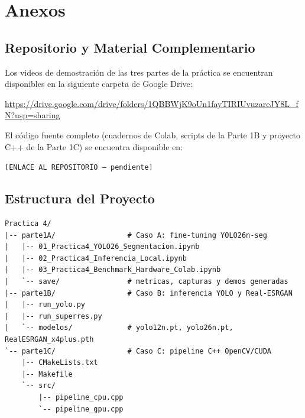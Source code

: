 \appendix
\section{Anexos}

\subsection{Repositorio y Material Complementario}

Los videos de demostración de las tres partes de la práctica se encuentran
disponibles en la siguiente carpeta de Google Drive:

\begin{center}
  \url{https://drive.google.com/drive/folders/1QBBWjK9oUn1fayTIRIUvuzareJY8L_fN?usp=sharing}
\end{center}

El código fuente completo (cuadernos de Colab, scripts de la Parte 1B y
proyecto C++ de la Parte 1C) se encuentra disponible en:

\begin{center}
  \texttt{[ENLACE AL REPOSITORIO -- pendiente]}
\end{center}

\subsection{Estructura del Proyecto}

\begin{lstlisting}[style=code]
Practica 4/
|-- parte1A/                 # Caso A: fine-tuning YOLO26n-seg
|   |-- 01_Practica4_YOLO26_Segmentacion.ipynb
|   |-- 02_Practica4_Inferencia_Local.ipynb
|   |-- 03_Practica4_Benchmark_Hardware_Colab.ipynb
|   `-- save/                # metricas, capturas y demos generadas
|-- parte1B/                 # Caso B: inferencia YOLO y Real-ESRGAN
|   |-- run_yolo.py
|   |-- run_superres.py
|   `-- modelos/             # yolo12n.pt, yolo26n.pt, RealESRGAN_x4plus.pth
`-- parte1C/                 # Caso C: pipeline C++ OpenCV/CUDA
    |-- CMakeLists.txt
    |-- Makefile
    `-- src/
        |-- pipeline_cpu.cpp
        `-- pipeline_gpu.cpp
\end{lstlisting}
